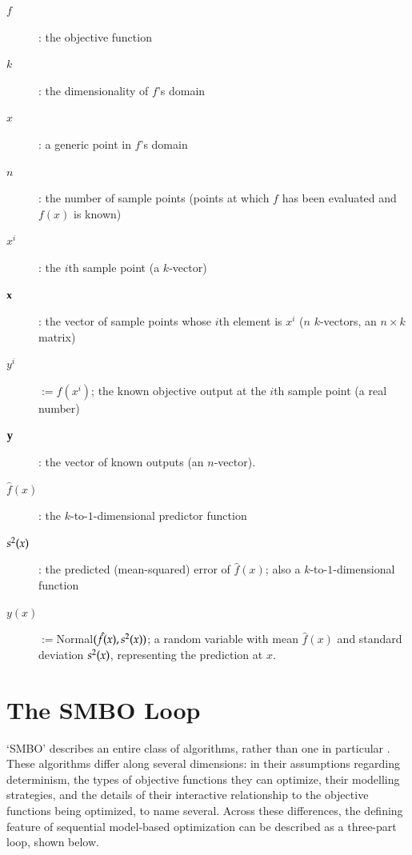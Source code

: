 \begin{minipage}{\textwidth}
\begin{framed}
\begin{description}
  \item[$f$]: the objective function
  \item[$k$]: the dimensionality of $f$'s domain
  \item[$x$]: a generic point in $f$'s domain
  \item[$n$]: the number of sample points (points at which $f$ has been evaluated and $f(x)$ is known)
  \item[$x^i$]: the $i$th sample point (a $k$-vector)
  \item[$\mathbf{x}$]: the vector of sample points whose $i$th element is $x^i$ ($n$ $k$-vectors, an $n\times k$ matrix)
  \item[$y^i$]$:= f(x^i)$; the known objective output at the $i$th sample point (a real number)
  \item[$\mathbf{y}$]: the vector of known outputs (an $n$-vector).
  \item[$\hat{f}(x)$]: the $k$-to-$1$-dimensional predictor function
  \item[$s^2(x)$]: the predicted (mean-squared) error of $\hat{f}(x)$; also a $k$-to-$1$-dimensional function
  \item[$y(x)$]$:=$Normal$(\hat{f}(x),s^2(x))$; a random variable with mean $\hat{f}(x)$ and standard deviation $s^2(x)$, representing the prediction at $x$.
\end{description}


\end{framed}
\label{fig:notation}
\end{minipage}

\section{The SMBO Loop}

`SMBO' describes an entire class of algorithms, rather than one in particular \cite{hutter_sequential_2011, hamadi_autonomous_2012, jones_efficient_1998, rasmussen_gaussian_2006}. %
These algorithms differ along several dimensions: in their assumptions regarding determinism, the types of objective functions they can optimize, their modelling strategies, and the details of their interactive relationship to the objective functions being optimized, to name several. %
Across these differences, the defining feature of sequential model-based optimization can be described as a three-part loop, shown below.

